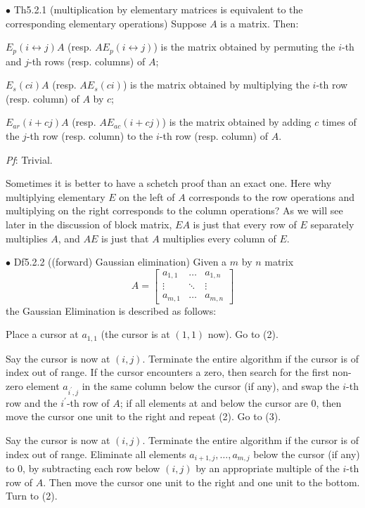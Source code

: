 \documentclass{article}
\begin{document}
\begin{Th}{$\bullet$ Th5.2.1 (multiplication by elementary matrices is equivalent to the corresponding elementary operations)}
    Suppose $A$ is a matrix. Then:
    \begin{compactenum}
        \item $E_p(i\leftrightarrow j)A$ (resp. $AE_p(i\leftrightarrow j)$) is the matrix obtained by permuting the $i$-th and $j$-th rows (resp. columns) of $A$;
        \item $E_s(ci)A$ (resp. $AE_s(ci)$) is the matrix obtained by multiplying the $i$-th row (resp. column) of $A$ by $c$;
        \item $E_{ar}(i+cj)A$ (resp. $AE_{ac}(i+cj)$) is the matrix obtained by adding $c$ times of the $j$-th row (resp. column) to the $i$-th row (resp. column) of $A$.
    \end{compactenum}
    \tcblower
    \textit{Pf}: Trivial.
\end{Th}

\begin{Rmk}{}
    Sometimes it is better to have a schetch proof than an exact one. Here why multiplying elementary $E$ on the left of $A$ corresponds to the row operations and multiplying on the right corresponds to the column operations? As we will see later in the discussion of block matrix, $EA$ is just that every row of $E$ separately multiplies $A$, and $AE$ is just that $A$ multiplies every column of $E$. 
\end{Rmk}

\begin{Df}{$\bullet$ Df5.2.2 ((forward) Gaussian elimination)}
    Given a $m$ by $n$ matrix
    $$A = \begin{bmatrix}
        a_{1,1} & \dots & a_{1,n}\\
        \vdots & \ddots & \vdots\\
        a_{m,1} & \dots & a_{m,n}
    \end{bmatrix}$$
    the Gaussian Elimination is described as follows:
    \begin{compactenum}
        \item Place a cursor at $a_{1,1}$ (the cursor is at $(1,1)$ now). Go to (2).
        \item Say the cursor is now at $(i,j)$. Terminate the entire algorithm if the cursor is of index out of range. If the cursor encounters a zero, then search for the first non-zero element $a_{i^\prime, j}$ in the same column below the cursor (if any), and swap the $i$-th row and the $i^\prime$-th row of $A$; if all elements at and below the cursor are $0$, then move the cursor one unit to the right and repeat (2). Go to (3).
        \item Say the cursor is now at $(i,j)$. Terminate the entire algorithm if the cursor is of index out of range. Eliminate all elements $a_{i+1, j}, \dots, a_{m, j}$ below the cursor (if any) to $0$, by subtracting each row below $(i,j)$ by an appropriate multiple of the $i$-th row of $A$. Then move the cursor one unit to the right and one unit to the bottom. Turn to (2).
    \end{compactenum}
\end{Df}
\end{document}
